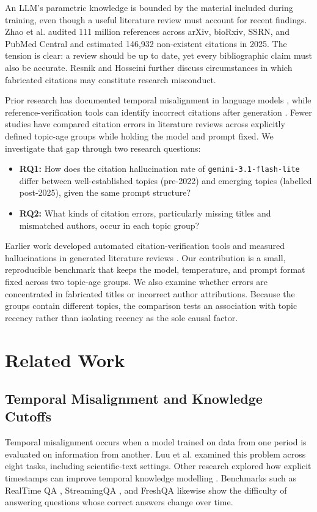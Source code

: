 \documentclass[manuscript,screen]{acmart}
\begin{document}
An LLM's parametric knowledge is bounded by the material included during training, even though a useful literature review must account for recent findings. Zhao et al. \cite{zhao2026wild} audited 111 million references across arXiv, bioRxiv, SSRN, and PubMed Central and estimated 146,932 non-existent citations in 2025. The tension is clear: a review should be up to date, yet every bibliographic claim must also be accurate. Resnik and Hosseini \cite{resnik2026misconduct} further discuss circumstances in which fabricated citations may constitute research misconduct.

Prior research has documented temporal misalignment in language models \cite{luu2022time}, while reference-verification tools can identify incorrect citations after generation \cite{abbonato2026checkifexist, khajavi2026citecheck}. Fewer studies have compared citation errors in literature reviews across explicitly defined topic-age groups while holding the model and prompt fixed. We investigate that gap through two research questions:
\begin{itemize}
    \item \textbf{RQ1:} How does the citation hallucination rate of \texttt{gemini-3.1-flash-lite} differ between well-established topics (pre-2022) and emerging topics (labelled post-2025), given the same prompt structure?
    \item \textbf{RQ2:} What kinds of citation errors, particularly missing titles and mismatched authors, occur in each topic group?
\end{itemize}

Earlier work developed automated citation-verification tools \cite{abbonato2026checkifexist} and measured hallucinations in generated literature reviews \cite{tang2025automated}. Our contribution is a small, reproducible benchmark that keeps the model, temperature, and prompt format fixed across two topic-age groups. We also examine whether errors are concentrated in fabricated titles or incorrect author attributions. Because the groups contain different topics, the comparison tests an association with topic recency rather than isolating recency as the sole causal factor.

\section{Related Work}

\subsection{Temporal Misalignment and Knowledge Cutoffs}
Temporal misalignment occurs when a model trained on data from one period is evaluated on information from another. Luu et al. \cite{luu2022time} examined this problem across eight tasks, including scientific-text settings. Other research explored how explicit timestamps can improve temporal knowledge modelling \cite{dhingra2022time}. Benchmarks such as RealTime QA \cite{kasai2022realtime}, StreamingQA \cite{liska2022streamingqa}, and FreshQA \cite{vu2023freshllms} likewise show the difficulty of answering questions whose correct answers change over time.
\end{document}
